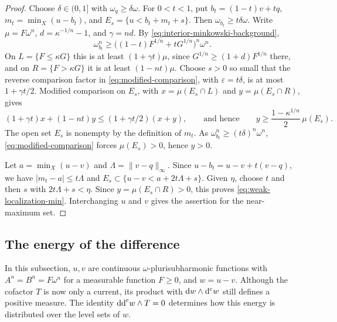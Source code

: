 \begin{proof}
Choose $\delta\in(0,1]$ with $\omega_q\geq\delta \omega$. For $0<t<1$, put $b_t=(1-t)v+tq$, $m_t=\min_X(u-b_t)$, and $E_s=\{u<b_t+m_t+s\}$. Then $\omega_{b_t}\geq t\delta \omega$. Write $\mu=F\omega^n$, $d=\kappa^{-1/n}-1$, and $\gamma=nd$. By \eqref{eq:interior-minkowski-background},
\[
\omega_{b_t}^n\geq\bigl((1-t)F^{1/n}+tG^{1/n}\bigr)^n \omega^n.
\]
On $L=\{F\leq\kappa G\}$ this is at least $(1+\gamma t)\mu$, since $G^{1/n}\geq(1+d)F^{1/n}$ there, and on $R=\{F>\kappa G\}$ it is at least $(1-nt)\mu$. Choose $s>0$ so small that the reverse comparison factor in \eqref{eq:modified-comparison}, with $\varepsilon=t\delta$, is at most $1+\gamma t/2$. Modified comparison on $E_s$, with $x=\mu(E_s\cap L)$ and $y=\mu(E_s\cap R)$, gives
\[
(1+\gamma t)x+(1-nt)y\leq(1+\gamma t/2)(x+y),
\qquad\text{and hence}\qquad y\geq\frac{1-\kappa^{1/n}}2\,\mu(E_s).
\]
The open set $E_s$ is nonempty by the definition of $m_t$. As $\omega_{b_t}^n\geq(t\delta)^n\omega^n$, \eqref{eq:modified-comparison} forces $\mu(E_s)>0$, hence $y>0$.

Let $a=\min_X(u-v)$ and $\Lambda=\|v-q\|_\infty$. Since $u-b_t=u-v+t(v-q)$, we have $|m_t-a|\leq t\Lambda$ and $E_s\subset\{u-v<a+2t\Lambda+s\}$. Given $\eta$, choose $t$ and then $s$ with $2t\Lambda+s<\eta$. Since $y=\mu(E_s\cap R)>0$, this proves \eqref{eq:weak-localization-min}. Interchanging $u$ and $v$ gives the assertion for the near-maximum set.
\end{proof}

\subsection{The energy of the difference}

In this subsection, $u,v$ are continuous $\omega$-plurisubharmonic functions with $A^n=B^n=F\omega^n$ for a measurable function $F\geq0$, and $w=u-v$. Although the cofactor $T$ is now only a current, its product with $\mathrm dw\wedge\mathrm d^{\mathrm c} w$ still defines a positive measure. The identity $\mathrm{dd}^{\mathrm{c}} w\wedge T=0$ determines how this energy is distributed over the level sets of $w$.

